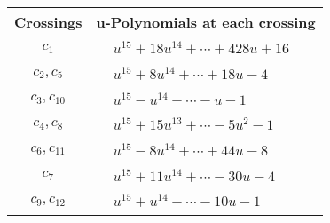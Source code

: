 \documentclass[1p]{elsarticle_modified}
\theoremstyle{definition}
\begin{document}
\begin{tabular}{m{50pt}|m{274pt}}
Crossings & \hspace{64pt}u-Polynomials at each crossing \\
\hline $$\begin{aligned}c_{1}\end{aligned}$$&$\begin{aligned}
&u^{15}+18 u^{14}+\cdots+428 u+16
\end{aligned}$\\
\hline $$\begin{aligned}c_{2},c_{5}\end{aligned}$$&$\begin{aligned}
&u^{15}+8 u^{14}+\cdots+18 u-4
\end{aligned}$\\
\hline $$\begin{aligned}c_{3},c_{10}\end{aligned}$$&$\begin{aligned}
&u^{15}- u^{14}+\cdots- u-1
\end{aligned}$\\
\hline $$\begin{aligned}c_{4},c_{8}\end{aligned}$$&$\begin{aligned}
&u^{15}+15 u^{13}+\cdots-5 u^2-1
\end{aligned}$\\
\hline $$\begin{aligned}c_{6},c_{11}\end{aligned}$$&$\begin{aligned}
&u^{15}-8 u^{14}+\cdots+44 u-8
\end{aligned}$\\
\hline $$\begin{aligned}c_{7}\end{aligned}$$&$\begin{aligned}
&u^{15}+11 u^{14}+\cdots-30 u-4
\end{aligned}$\\
\hline $$\begin{aligned}c_{9},c_{12}\end{aligned}$$&$\begin{aligned}
&u^{15}+u^{14}+\cdots-10 u-1
\end{aligned}$\\
\hline
\end{tabular}\\~\\
\newpage\renewcommand{\arraystretch}{1}
\end{document}
